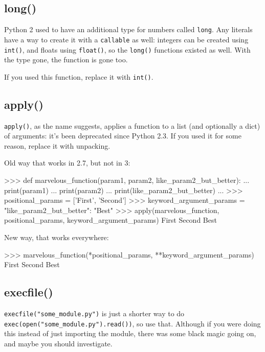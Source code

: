 \subsection{long()}

Python 2 used to have an additional type for numbers called \lstinline{long}. Any \glspl{literal} have a way to create it with a \lstinline{callable} as well: integers can be created using \lstinline{int()}, and floats using \lstinline{float()}, so the \lstinline{long()} functions existed as well. With the type gone, the function is gone too.

If you used this function, replace it with \lstinline{int()}.

\subsection{apply()}

\lstinline{apply()}, as the name suggests, applies a function to a list (and optionally a dict) of arguments: it's been deprecated since Python 2.3. If you used it for some reason, replace it with unpacking.

Old way that works in 2.7, but not in 3:

\begin{py2}
>>> def marvelous_function(param1, param2, like_param2_but_better):
...    print(param1)
...    print(param2)
...    print(like_param2_but_better)
...
>>> positional_params = ['First', 'Second']
>>> keyword_argument_params = {"like_param2_but_better": "Best"}
>>> apply(marvelous_function, positional_params, keyword_argument_params)
First
Second
Best
\end{py2}

New way, that works everywhere:

\begin{py2and3}
>>> marvelous_function(*positional_params, **keyword_argument_params)
First
Second
Best
\end{py2and3}

\subsection{execfile()}

\lstinline{execfile("some_module.py")} is just a shorter way to do \lstinline{exec(open("some_module.py").read())}, so use that. Although if you were doing this instead of just importing the module, there was some black magic going on, and maybe you should investigate.


